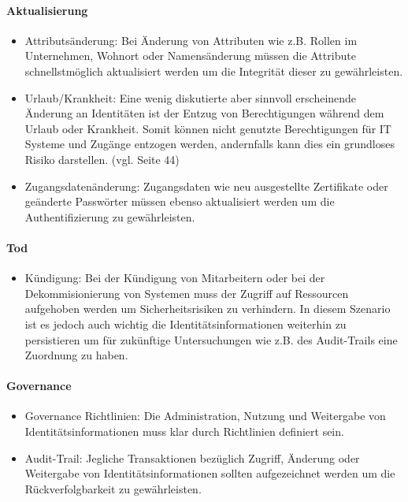 \documentclass[11pt]{article}
\begin{document}
\paragraph{Aktualisierung}
\begin{itemize}
  \item Attributsänderung: Bei Änderung von Attributen wie z.B. Rollen im Unternehmen, Wohnort oder Namensänderung müssen die Attribute schnellstmöglich aktualisiert werden um die Integrität dieser zu gewährleisten.
  \item Urlaub/Krankheit: Eine wenig diskutierte aber sinnvoll erscheinende Änderung an Identitäten ist der Entzug von Berechtigungen während dem Urlaub oder Krankheit. Somit können nicht genutzte Berechtigungen für IT Systeme und Zugänge entzogen werden, andernfalls kann dies ein grundloses Risiko darstellen. (vgl. \cite{tsolkas2017} Seite 44)
  \item Zugangsdatenänderung: Zugangsdaten wie neu ausgestellte Zertifikate oder geänderte Passwörter müssen ebenso aktualisiert werden um die Authentifizierung zu gewährleisten.
\end{itemize}
\paragraph{Tod}
\begin{itemize}
  \item Kündigung: Bei der Kündigung von Mitarbeitern oder bei der Dekommisionierung von Systemen muss der Zugriff auf Ressourcen aufgehoben werden um Sicherheitsrisiken zu verhindern. In diesem Szenario ist es jedoch auch wichtig die Identitätsinformationen weiterhin zu persistieren um für zukünftige Untersuchungen wie z.B. des Audit-Trails eine Zuordnung zu haben.
\end{itemize}
\paragraph{Governance}
\begin{itemize}
  \item Governance Richtlinien: Die Administration, Nutzung und Weitergabe von Identitätsinformationen muss klar durch Richtlinien definiert sein.
  \item Audit-Trail: Jegliche Transaktionen bezüglich Zugriff, Änderung oder Weitergabe von Identitätsinformationen sollten aufgezeichnet werden um die Rückverfolgbarkeit zu gewährleisten.
\end{itemize}
\end{document}
